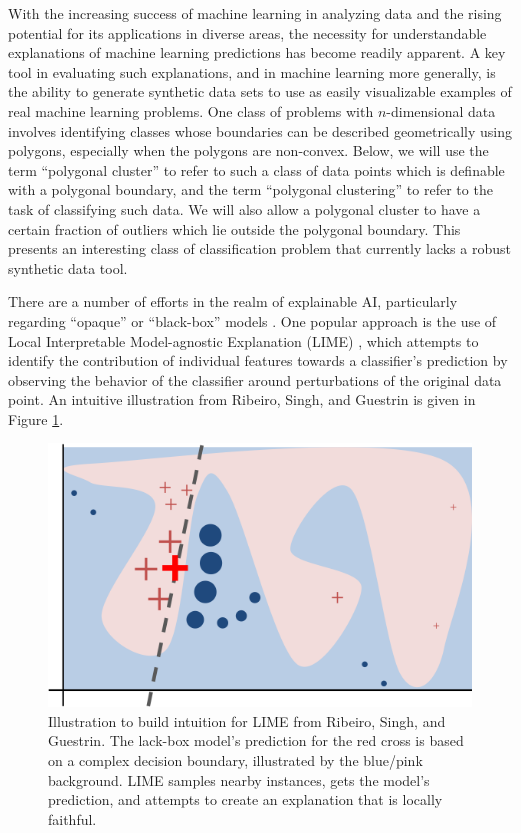 \documentclass[manuscript,screen,review]{acmart}
\begin{document}
With the increasing success of machine learning in analyzing data and the rising potential for its
applications in diverse areas, the necessity for understandable explanations of machine learning predictions
has become readily apparent. A key tool in evaluating such explanations, and in machine learning more generally,
is the ability to generate synthetic data sets to use as easily visualizable examples of real machine learning problems.
One class of problems with $n$-dimensional data involves identifying classes whose boundaries can be described
geometrically using polygons, especially when the polygons are non-convex. Below, we will use the term ``polygonal cluster'' 
to refer to such a class of data points which is definable with a polygonal boundary, and the term ``polygonal clustering'' to refer to the task of classifying such data. We will also allow a polygonal cluster to have a certain fraction of outliers which lie outside the polygonal boundary.
This presents an interesting class of classification problem that currently lacks a robust synthetic data tool.

There are a number of efforts in the realm of explainable AI, particularly regarding ``opaque'' or ``black-box''
models \cite{xai-pp}. One popular approach is the use of Local Interpretable Model-agnostic Explanation (LIME)
\cite{lime}, which attempts to identify the contribution of individual features towards a classifier's prediction
by observing the behavior of the classifier around perturbations of the original data point. An intuitive
illustration from Ribeiro, Singh, and Guestrin \cite{lime} is given in Figure \ref{fig:lime}.
\begin{figure}[ht]
    \centering
    \includegraphics[width=.5\textwidth]{images/lime.png}
    \caption{
        Illustration to build intuition for LIME from Ribeiro, Singh, and Guestrin\cite{lime}.
        The lack-box model's prediction for the red cross is based on a complex decision boundary,
        illustrated by the blue/pink background. LIME samples nearby instances, gets the model's
        prediction, and attempts to create an explanation that is locally faithful.
    }
    \label{fig:lime}
\end{figure}
\end{document}

